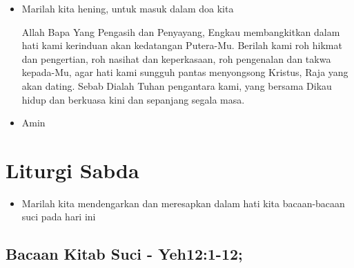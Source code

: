 \documentclass[a4paper,12pt]{article}
\newcommand{\BU}[1]{\begin{itemize} \item[U:] #1 \end{itemize}}
\newcommand{\BP}[1]{\begin{itemize} \item[P:] #1 \end{itemize}}
\begin{document}
\BP{Marilah kita hening, untuk masuk dalam doa kita

Allah Bapa Yang Pengasih dan Penyayang, Engkau membangkitkan dalam hati kami kerinduan akan kedatangan Putera-Mu.
Berilah kami roh hikmat dan pengertian, roh nasihat dan keperkasaan, roh pengenalan dan takwa kepada-Mu, agar hati kami
sungguh pantas menyongsong Kristus, Raja yang akan dating. Sebab Dialah Tuhan pengantara kami, yang bersama Dikau hidup
dan berkuasa kini dan sepanjang segala masa.}

\BU{Amin}

\section{Liturgi Sabda}

\BP{Marilah kita mendengarkan dan meresapkan dalam hati kita bacaan-bacaan suci pada hari ini}

\subsection*{Bacaan Kitab Suci - Yeh12:1-12;}
\end{document}
